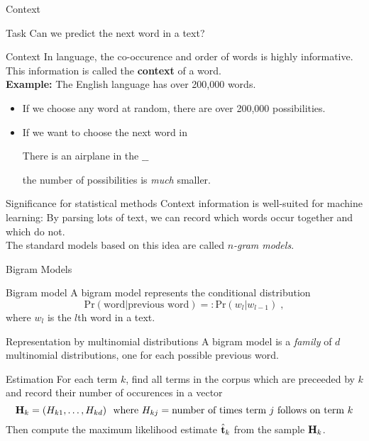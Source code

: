 \documentclass[dvipsnames,mathserif]{beamer}
\begin{document}
{\begin{frame}{Context}
  \begin{block}{Task}
    Can we predict the next word in a text?
  \end{block}
  \begin{block}{Context}
    In language, the co-occurence and order of words is highly
    informative. This information is called the \textbf{context} of a
    word.\\
    \textbf{Example:} The English language has over 200,000 words. 
    \begin{itemize}
    \item If we choose any word at random, there are over 200,000
      possibilities.
    \item If we want to choose the next word in
      \begin{center}
        There is an airplane in the $\_\_$
      \end{center}
      the number of possibilities is \emph{much} smaller.
    \end{itemize}
  \end{block}
\vspace{-2mm}
  \begin{block}{Significance for statistical methods}
    Context information is well-suited for machine learning: By
    parsing lots of text, we can record which words occur together and
    which do not.\\
    \vspace{3mm}
    The standard models based on this idea are called \emph{$n$-gram models}.
  \end{block}
\end{frame}

\def\Prob{\mbox{Pr}}
\begin{frame}{Bigram Models}
  \begin{block}{Bigram model}
    A bigram model represents the conditional distribution
    \begin{equation*}
      \Prob(\text{word}|\text{previous word}) = :\Prob(w_l|w_{l-1}) \;,
    \end{equation*}
    where $w_l$ is the $l$th word in a text.
  \end{block}
  \begin{block}{Representation by multinomial distributions}
    A bigram model is a \emph{family} of $d$ multinomial distributions,
    one for each possible previous word.
  \end{block}
  \begin{block}{Estimation}
    For each term $k$, find all terms in the corpus which are
    preceeded by $k$ and record their number of occurences in a vector
    \begin{equation*}
      \mathbf{H}_k=(H_{k1},\ldots,H_{kd}) \ \text{ where } H_{kj}=\text{number of times term $j$ follows on term $k$}
    \end{equation*}
    Then compute the maximum likelihood estimate $\hat{\mathbf{t}}_k$ from
    the sample $\mathbf{H}_k$.  
    

\end{block}
\end{frame}}
\end{document}
